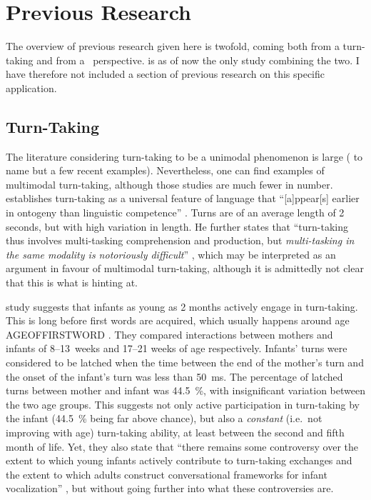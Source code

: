 \section{Previous Research}
\label{sec:introductionresearch}
The overview of previous research given here is twofold, coming both from a turn-taking and from a \fpmlower\ perspective.
\citet{rohlfing_multimodal_nodate} is as of now the only study combining the two.
I have therefore not included a section of previous research on this specific application.


\subsection{Turn-Taking}
\label{sec:introductionresearchturntaking}
The literature considering turn-taking to be a unimodal phenomenon is large (\citep{casillas_turn-taking_2016,freud_turn-taking_2016,heldner_pauses_2010} to name but a few recent examples).
Nevertheless, one can find examples of multimodal turn-taking, although those studies are much fewer in number.
\citet{levinson_turn-taking_2016} establishes turn-taking as a universal feature of language that ``[a]ppear[s] earlier in ontogeny than linguistic competence'' \citep[]{levinson_turn-taking_2016}.
Turns are of an average length of 2 seconds, but with high variation in length.
He further states that ``turn-taking thus involves multi-tasking comprehension and production, but \emph{multi-tasking in the same modality is notoriously difficult}'' \citep[, emphasis mine]{levinson_turn-taking_2016}, which may be interpreted as an argument in favour of multimodal turn-taking, although it is admittedly not clear that this is what \citeauthor{levinson_turn-taking_2016} is hinting at.%

 study suggests that infants as young as 2 months actively engage in turn-taking.
This is long before first words are acquired, which usually happens around age AGEOFFIRSTWORD \citep{nosource}.
 They compared interactions between mothers and infants of 8--13~weeks and 17--21 weeks of age respectively.
Infants' turns were considered to be latched when the time between the end of the mother's turn and the onset of the infant's turn was less than 50~ms.
The percentage of latched turns between mother and infant was 44.5~\%, with insignificant variation between the two age groups.
This suggests not only active participation in turn-taking by the infant (44.5~\% being far above chance), but also a \emph{constant} (i.e.\ not improving with age) turn-taking ability, at least between the second and fifth month of life.
Yet, they also state that ``there remains some controversy over the extent to which young infants actively contribute to turn-taking exchanges and the extent to which adults construct conversational frameworks for infant vocalization'' \citep[]{gratier_early_2015}, but without going further into what these controversies are.

